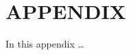 \documentclass[prodmode,acmtochi]{acmsmall} %
\begin{document}
%
%
%
%
%
%
%
%
%

\appendix
\section*{APPENDIX}
\setcounter{section}{1}
In this appendix \ldots
{}
\end{document}
